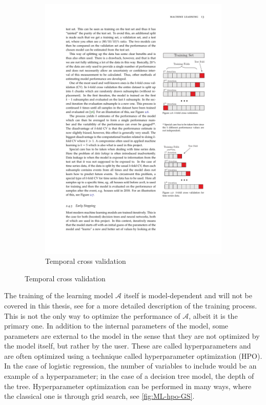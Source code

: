 \begin{figure}[htbp]
\begin{subfigure}{.5\textwidth}
        \includegraphics[trim={14.14cm 7.67cm 2.1cm 16.5cm}, clip, width=.8\linewidth]{figures/MasterThesis-cross-validation}
        \caption{Temporal cross validation}
        \label{fig:ML-crossval-temporal}
    \end{subfigure}
\end{figure}

The training of the learning model $\mathcal{A}$ itself is model-dependent and will not be covered in this thesis, see \autocite{michelsenPhysicistApproachMachine2020} for a more detailed description of the training process. This is not the only way to optimize the performance of  $\mathcal{A}$, albeit it is the primary one. In addition to the internal parameters of the model, some parameters are external to the model in the sense that they are not optimized by the model itself, but rather by the user. These are called hyperparameters and are often optimized using a technique called hyperparameter optimization (HPO). In the case of logistic regression, the number of variables to include would be an example of a hyperparameter; in the case of a decision tree model, the depth of the tree. Hyperparameter optimization can be performed in many ways, where the classical one is through grid search, see \autoref{fig:ML-hpo-GS}.

